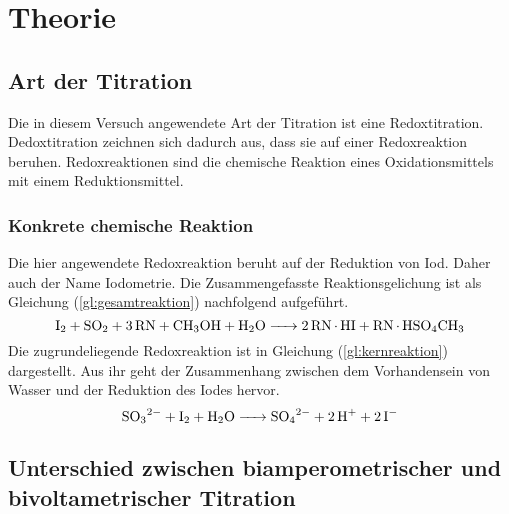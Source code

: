 \section{Theorie}
\label{sec:theorie}

\subsection{Art der Titration}
Die in diesem Versuch angewendete Art der Titration ist eine Redoxtitration. Dedoxtitration zeichnen sich dadurch aus, dass sie auf einer Redoxreaktion beruhen. Redoxreaktionen sind die chemische Reaktion eines Oxidationsmittels mit einem Reduktionsmittel.\cite{redoxreaktion}
\subsubsection{Konkrete chemische Reaktion}
Die hier angewendete Redoxreaktion beruht auf der Reduktion von Iod. Daher auch der Name Iodometrie. Die Zusammengefasste Reaktionsgelichung ist als Gleichung (\ref{gl:gesamtreaktion}) nachfolgend aufgeführt. 
\begin{equation}\label{gl:gesamtreaktion}
	\ce{I2 + SO2 + 3 RN + CH3OH + H2O -> 2RN*HI + RN*HSO4CH3}
\end{equation}
Die zugrundeliegende Redoxreaktion ist in Gleichung (\ref{gl:kernreaktion}) dargestellt. Aus ihr geht der Zusammenhang zwischen dem Vorhandensein von Wasser und der Reduktion des Iodes hervor.
\begin{equation}\label{gl:kernreaktion}
	\ce{SO3^2- +I2 +H2O -> SO4^2- + 2H^+ +2I-}
\end{equation}
\subsection{Unterschied zwischen biamperometrischer und bivoltametrischer Titration}

